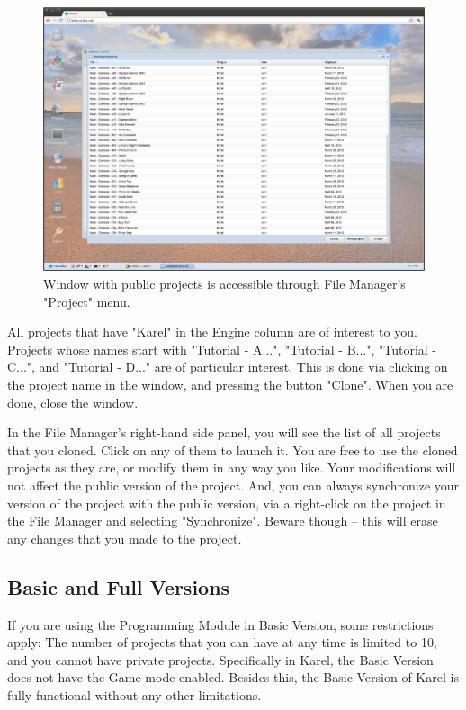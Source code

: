 \documentclass[article,A4,12pt]{llncs}
\begin{document}
\begin{figure}[!ht]
\begin{center}
\includegraphics[width=\textwidth]{img/cloning.png}
\end{center}
\caption{Window with public projects is accessible through File Manager's "Project" menu.}
\label{fig:cloning}
\end{figure}
\noindent
All projects that have "Karel" in the Engine column are of interest to you. 
Projects whose names start with "Tutorial - A...", "Tutorial - B...",
"Tutorial - C...", and "Tutorial - D..." are of particular interest.
This is done via clicking on the project 
name in the window, and pressing the button "Clone". When you are done, close the 
window. 

In the File Manager's right-hand side panel, you will see the list of all 
projects that you cloned. Click on any of them to launch it. You are free to 
use the cloned projects as they are, or modify them in any way you like. Your modifications 
will not affect the public version of the project. And, you can 
always synchronize your version of the project with the public version, via 
a right-click on the project in the File Manager and selecting "Synchronize".
Beware though -- this will erase any changes that you made to the project.

\subsection{Basic and Full Versions}

If you are using the Programming Module in Basic Version, some restrictions apply: The 
number of projects that you can have at any time is limited to 10, and you cannot have
private projects. Specifically in Karel, the Basic Version does not have the Game mode 
enabled. Besides this, the Basic Version of Karel is fully functional without any other 
limitations. 
\end{document}
